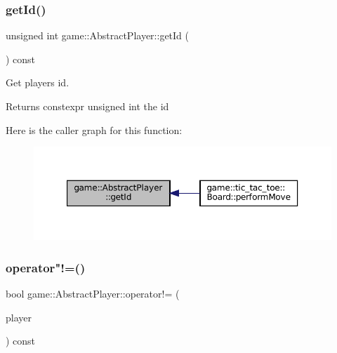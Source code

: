 \subsubsection{\texorpdfstring{get\+Id()}{getId()}}
{\footnotesize\ttfamily unsigned int game\+::\+Abstract\+Player\+::get\+Id (\begin{DoxyParamCaption}{ }\end{DoxyParamCaption}) const\hspace{0.3cm}{\ttfamily [inline]}}



Get player\textquotesingle{}s id. 

\begin{DoxyReturn}{Returns}
constexpr unsigned int the id 
\end{DoxyReturn}
Here is the caller graph for this function\+:
\nopagebreak
\begin{figure}[H]
\begin{center}
\leavevmode
\includegraphics[width=350pt]{classgame_1_1_abstract_player_a88e33e40f98283588a535f66bf1b6640_icgraph}
\end{center}
\end{figure}
\mbox{\label{classgame_1_1_abstract_player_a3c88c5ef8f89fd74b3e48ff636049c94}} 
\subsubsection{\texorpdfstring{operator"!=()}{operator!=()}}
{\footnotesize\ttfamily bool game\+::\+Abstract\+Player\+::operator!= (\begin{DoxyParamCaption}\item[{const \hyperlink{classgame_1_1_abstract_player}{Abstract\+Player} \&}]{player }\end{DoxyParamCaption}) const\hspace{0.3cm}{\ttfamily [inline]}}

